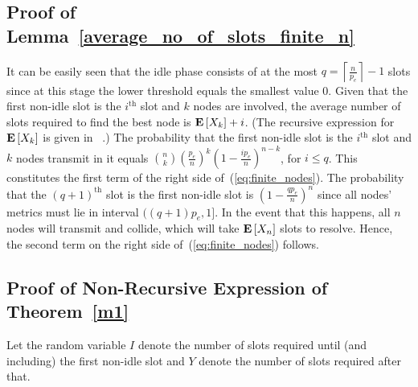 \documentclass[12pt,draftcls,peerreview, onecolumn]{IEEEtran}
\newcommand{\eqn}[1]{(\ref{#1})}
\newcommand{\ceil}[1]{\left\lceil {#1} \right\rceil}
\newcommand{\kth}{^{{\mathrm{th}}}}
\newcommand{\expect}[1]{{\bf E}\left[{#1}\right]}
\newcommand{\EX}[1]{\expect{X_{#1}}}
\begin{document}
\appendix

\subsection{Proof of Lemma~\ref{average_no_of_slots_finite_n}}
\label{proof of average_no_of_slots_finite_n}
It can be easily seen that the idle phase consists of at the most $q =
\ceil{\frac{n}{p_e}}-1$ slots since at this stage the lower threshold
equals the smallest value $0$.  Given that the first non-idle slot is
the $i\kth$ slot and $k$ nodes are involved, the average number of
slots required to find the best node is $\EX{k}+i$. (The recursive
expression for $\EX{k}$ is given in~ \cite[(6)]{qin_infocomm_2004}.)
The probability that the first non-idle slot is the $i\kth$ slot and
$k$ nodes transmit in it equals $
\binom{n}{k}\left(\frac{p_e}{n}\right)^{k}
\left(1-\frac{ip_e}{n}\right)^{n-k}$, for $i \le q$. This constitutes
the first term of the right side of~\eqn{eq:finite_nodes}.  The
probability that the $(q+1)\kth$ slot is the first non-idle slot is
$(1-\frac{qp_e}{n})^n$ since all nodes' metrics must lie in interval
$((q+1)p_{e},1]$. In the event that this happens, all $n$ nodes will
transmit and collide, which will take $\EX{n}$ slots to resolve.
Hence, the second term on the right side of~\eqn{eq:finite_nodes}
follows.


\subsection{Proof of Non-Recursive Expression of Theorem~\ref{m1}}
\label{proof of m2}
Let the random variable $I$ denote the number of slots required until (and including) the first non-idle slot and $Y$ denote the number of slots required after that.
\end{document}
